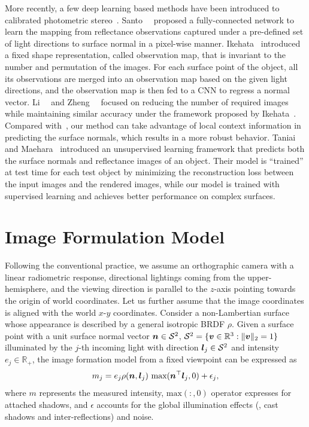 More recently, a few deep learning based methods have been introduced to calibrated photometric stereo~\cite{santo2017deep,Taniai18,ikehata2018cnn}. Santo~\etal~\cite{santo2017deep} proposed a fully-connected network to learn the mapping from reflectance observations captured under a pre-defined set of light directions to surface normal in a pixel-wise manner. 
Ikehata~\cite{ikehata2018cnn} introduced a fixed shape representation, called observation map, that is invariant to the number and permutation of the images. For each surface point of the object, all its observations are merged into an observation map based on the given light directions, and the observation map is then fed to a CNN to regress a normal vector. 
Li~\etal~\cite{li2019learning} and Zheng~\etal~\cite{zheng2019spline} focused on reducing the number of required images while maintaining similar accuracy under the framework proposed by Ikehata~\cite{ikehata2018cnn}.
Compared with~\cite{santo2017deep,ikehata2018cnn}, our method can take advantage of local context information in predicting the surface normals, which results in a more robust behavior.
Taniai and Maehara~\cite{Taniai18} introduced an unsupervised learning framework that predicts both the surface normals and reflectance images of an object. Their model is ``trained'' at test time for each test object by minimizing the reconstruction loss between the input images and the rendered images, while our model is trained with supervised learning and achieves better performance on complex surfaces.

\section{Image Formulation Model}

Following the conventional practice, we assume an orthographic camera with a linear radiometric response, directional lightings coming from the upper-hemisphere, and the viewing direction is parallel to the $z$-axis pointing towards the origin of world coordinates. Let us further assume that the image coordinates is aligned with the world $x\text{-}y$ coordinates.
Consider a non-Lambertian surface whose appearance is described by a general isotropic BRDF $\rho$. Given a surface point with a unit surface normal vector $\boldsymbol{n} \in \mathcal{S}^2$, $\mathcal{S}^2 = \{\boldsymbol{v} \in \mathbb{R}^3 : \|\boldsymbol{v}\|_2 = 1\}$ illuminated by the $j$-th incoming light with direction $\boldsymbol{l}_j \in \mathcal{S}^2$ and intensity $e_j \in \mathbb{R}_+$, the image formation model from a fixed viewpoint can be expressed as
\begin{equation}
    \label{eq:formation}
    m_j = e_j \rho (\boldsymbol{n}, \boldsymbol{l}_j)~\text{max}(\boldsymbol{n}^\top \boldsymbol{l}_j, 0) + \epsilon_j,
\end{equation}
where $m$ represents the measured intensity, $\text{max}(:, 0)$ operator expresses for attached shadows, and $\epsilon$ accounts for the global illumination effects (\eg, cast shadows and inter-reflections) and noise.

